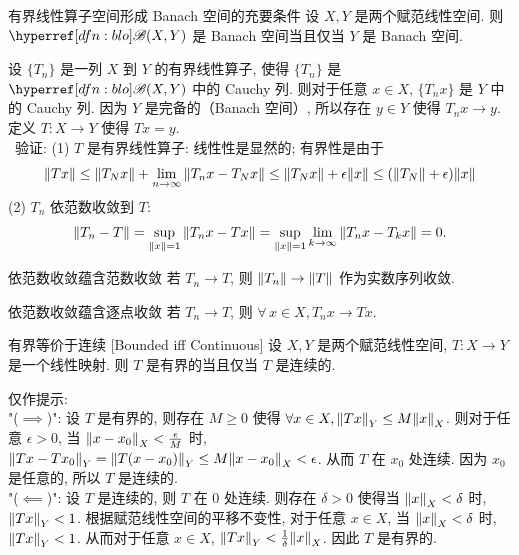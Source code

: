         \begin{thm}
            {有界线性算子空间形成 Banach 空间的充要条件}
            设 \(X,Y\) 是两个赋范线性空间. 则 \(\blo(X,Y)\) 是 Banach 空间当且仅当 \(Y\) 是 Banach 空间.
        \end{thm}

        \begin{prf}
            设 \(\{T_n\}\) 是一列 \(X\) 到 \(Y\) 的有界线性算子, 使得 \(\{T_n\}\) 是 \(\blo(X,Y)\) 中的 Cauchy 列. 则对于任意 \(x\in X\), \(\{T_n x\}\) 是 \(Y\) 中的 Cauchy 列. 因为 \(Y\) 是完备的（Banach 空间）, 所以存在 \(y\in Y\) 使得 \(T_n x\to y\). 定义 \(T:X\to Y\) 使得 \(Tx=y\). \\\
            验证: (1) \(T\) 是有界线性算子: 线性性是显然的; 有界性是由于
            \[\norm{Tx}\leq\norm{T_N x}+\lim_{n\to\infty}\norm{T_n x-T_N x}\leq\norm{T_N x}+\epsilon\norm{x}\leq(\norm{T_N}+\epsilon)\norm{x}\]
            (2) \(T_n\) 依范数收敛到 \(T\): 
            \[\norm{T_n-T}=\sup_{\norm{x}=1}\norm{T_n x-Tx}=\sup_{\norm{x}=1}\lim_{k\to\infty}\norm{T_n x-T_k x}=0.\]
        \end{prf}

        \begin{crl}
            {依范数收敛蕴含范数收敛}
            若 \(T_n\to T\), 则 \(\norm{T_n}\to\norm{T}\) 作为实数序列收敛.
        \end{crl}

        \begin{crl}
            {依范数收敛蕴含逐点收敛}
            若 \(T_n\to T\), 则 \(\forall\,x\in X, T_n x\to Tx\).
        \end{crl}

        \begin{thm}
            {有界等价于连续}
            [Bounded iff Continuous]
            设 \(X,Y\) 是两个赋范线性空间, \(T:X\to Y\) 是一个线性映射. 则 \(T\) 是有界的当且仅当 \(T\) 是连续的.
        \end{thm}

        \begin{prf}
            仅作提示:\\
            "(\(\implies\))": 设 \(T\) 是有界的, 则存在 \(M\geq 0\) 使得 \(\forall x\in X, \norm{Tx}_Y\leq M\norm{x}_X\). 则对于任意 \(\epsilon>0\), 当 \(\norm{x-x_0}_X<\frac{\epsilon}{M}\) 时, \(\norm{Tx-Tx_0}_Y=\norm{T(x-x_0)}_Y\leq M\norm{x-x_0}_X<\epsilon\). 从而 \(T\) 在 \(x_0\) 处连续. 因为 \(x_0\) 是任意的, 所以 \(T\) 是连续的.\\
            "(\(\impliedby\))": 设 \(T\) 是连续的, 则 \(T\) 在 \(0\) 处连续. 则存在 \(\delta>0\) 使得当 \(\norm{x}_X<\delta\) 时, \(\norm{Tx}_Y<1\). 根据赋范线性空间的平移不变性, 对于任意 \(x\in X\), 当 \(\norm{x}_X<\delta\) 时, \(\norm{Tx}_Y<1\). 从而对于任意 \(x\in X\), \(\norm{Tx}_Y<\frac{1}{\delta}\norm{x}_X\). 因此 \(T\) 是有界的.
        \end{prf}

